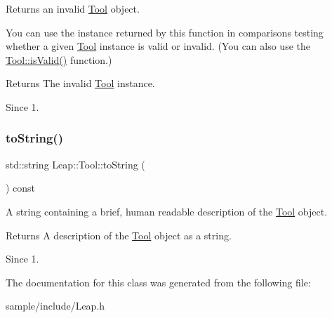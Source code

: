 Returns an invalid \hyperlink{class_leap_1_1_tool}{Tool} object.

You can use the instance returned by this function in comparisons testing whether a given \hyperlink{class_leap_1_1_tool}{Tool} instance is valid or invalid. (You can also use the \hyperlink{class_leap_1_1_pointable_afe50d02eb1b4f554a4089c329fda1a45}{Tool\+::is\+Valid()} function.)


\begin{DoxyCodeInclude}
\end{DoxyCodeInclude}


\begin{DoxyReturn}{Returns}
The invalid \hyperlink{class_leap_1_1_tool}{Tool} instance. 
\end{DoxyReturn}
\begin{DoxySince}{Since}
1. 
\end{DoxySince}
\mbox{\label{class_leap_1_1_tool_a0a5eb02f6687ad828cf0f9f1e6494a44}} 
\subsubsection{\texorpdfstring{to\+String()}{toString()}}
{\footnotesize\ttfamily std\+::string Leap\+::\+Tool\+::to\+String (\begin{DoxyParamCaption}{ }\end{DoxyParamCaption}) const\hspace{0.3cm}{\ttfamily [inline]}}

A string containing a brief, human readable description of the \hyperlink{class_leap_1_1_tool}{Tool} object.

\begin{DoxyReturn}{Returns}
A description of the \hyperlink{class_leap_1_1_tool}{Tool} object as a string. 
\end{DoxyReturn}
\begin{DoxySince}{Since}
1. 
\end{DoxySince}


The documentation for this class was generated from the following file\+:\begin{DoxyCompactItemize}
\item 
sample/include/Leap.\+h\end{DoxyCompactItemize}
